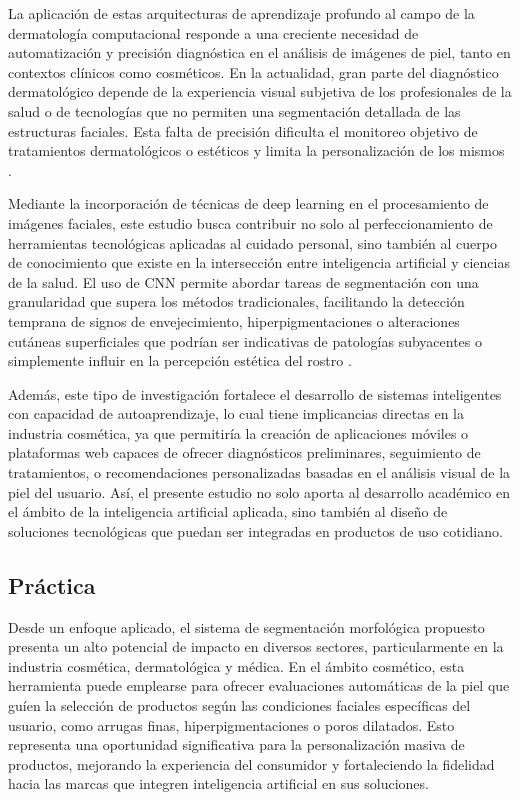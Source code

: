 La aplicación de estas arquitecturas de aprendizaje profundo al campo de la dermatología computacional responde a una creciente necesidad de automatización y precisión diagnóstica en el análisis de imágenes de piel, tanto en contextos clínicos como cosméticos. En la actualidad, gran parte del diagnóstico dermatológico depende de la experiencia visual subjetiva de los profesionales de la salud o de tecnologías que no permiten una segmentación detallada de las estructuras faciales. Esta falta de precisión dificulta el monitoreo objetivo de tratamientos dermatológicos o estéticos y limita la personalización de los mismos \parencite{lee2020}.

Mediante la incorporación de técnicas de deep learning en el procesamiento de imágenes faciales, este estudio busca contribuir no solo al perfeccionamiento de herramientas tecnológicas aplicadas al cuidado personal, sino también al cuerpo de conocimiento que existe en la intersección entre inteligencia artificial y ciencias de la salud. El uso de CNN permite abordar tareas de segmentación con una granularidad que supera los métodos tradicionales, facilitando la detección temprana de signos de envejecimiento, hiperpigmentaciones o alteraciones cutáneas superficiales que podrían ser indicativas de patologías subyacentes o simplemente influir en la percepción estética del rostro \parencite{phillips2020, gao2018}.

Además, este tipo de investigación fortalece el desarrollo de sistemas inteligentes con capacidad de autoaprendizaje, lo cual tiene implicancias directas en la industria cosmética, ya que permitiría la creación de aplicaciones móviles o plataformas web capaces de ofrecer diagnósticos preliminares, seguimiento de tratamientos, o recomendaciones personalizadas basadas en el análisis visual de la piel del usuario. Así, el presente estudio no solo aporta al desarrollo académico en el ámbito de la inteligencia artificial aplicada, sino también al diseño de soluciones tecnológicas que puedan ser integradas en productos de uso cotidiano.

\subsection{Práctica}
Desde un enfoque aplicado, el sistema de segmentación morfológica propuesto presenta un alto potencial de impacto en diversos sectores, particularmente en la industria cosmética, dermatológica y médica. En el ámbito cosmético, esta herramienta puede emplearse para ofrecer evaluaciones automáticas de la piel que guíen la selección de productos según las condiciones faciales específicas del usuario, como arrugas finas, hiperpigmentaciones o poros dilatados. Esto representa una oportunidad significativa para la personalización masiva de productos, mejorando la experiencia del consumidor y fortaleciendo la fidelidad hacia las marcas que integren inteligencia artificial en sus soluciones.

